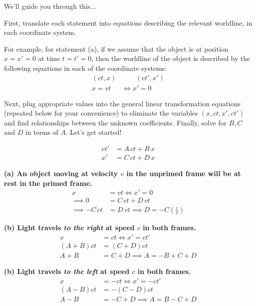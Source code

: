 \documentclass[11pt, letterpaper, openany]{book}
\begin{document}
We'll guide you through this...

First, translate each statement into equations describing the relevant worldline, in each coordinate system.

For example, for statement (a), if we assume that the object is at position $x=x'=0$ at time $t=t'=0$, then the worldline of the object is described by the following equations in each of the coordinate systems:
\begin{align*}
    (ct, x) &\qquad (ct', x') \\
    x = vt &\iff x' = 0
\end{align*}

Next, plug appropriate values into the general linear transformation equations (repeated below for your convenience) to eliminate the variables $(x, ct, x', ct')$ and find relationships between the unknown coefficients. Finally, solve for $B, C$ and $D$ in terms of $A$. Let's get started!

\begin{tcolorbox}[colback=white, boxrule=1pt, arc=3pt, width=0.4\textwidth, center]
\begin{align*}
    ct' &= A \, ct + B \, x \tag{1} \\
    x'  &= C \, ct + D \, x \tag{2}
\end{align*}
\end{tcolorbox}

\textbf{(a) An object moving at velocity $v$ in the unprimed frame will be at rest in the primed frame.}
\begin{align*}
    x &= vt \iff x' = 0 \tag*{1st statement} \\
    \implies 0 &= C \, ct + D \, vt \tag*{plug expressions for $x$ and $x'$ into (2)} \\
    \implies -C \, ct &= D \, vt \implies D = -C \left(\frac{c}{v}\right) \tag*{solve for $D$}
\end{align*}

\textbf{(b) Light travels \textit{to the right} at speed $c$ in both frames.}
\begin{align*}
    x &= ct \iff x' = ct' \tag*{2nd statement for rightgoing light} \\
    (A+B)ct &= (C+D)ct \tag*{plug expression for $x$ into (1) and (2)} \\
    A+B &= C+D \implies A = -B + C + D \tag*{solve for $A$, for example}
\end{align*}

\textbf{(b) Light travels \textit{to the left} at speed $c$ in both frames.}
\begin{align*}
    x &= -ct \iff x' = -ct' \tag*{2nd statement for leftgoing light} \\
    (A-B)ct &= -(C-D)ct \tag*{plug expression for $x$ into (1) and (2)} \\
    A-B &= -C+D \implies A = B - C + D \tag*{solve for $A$, for example}
\end{align*}
\end{document}
